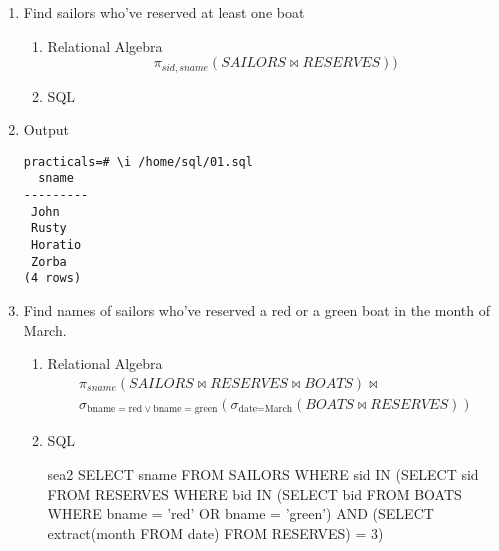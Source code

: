 \begin{enumerate}
	\item  Find sailors who've reserved at least one boat
	      \begin{enumerate}
		      \item Relational Algebra
		            \begin{equation*}
			            \pi_{sid, sname}(SAILORS \bowtie RESERVES))
		            \end{equation*}

		      \item  SQL \linebreak {}
	      \end{enumerate}

	      \pagebreak

	\item Output
	      \begin{lstlisting}[style=output]
practicals=# \i /home/sql/01.sql 
  sname  
---------
 John
 Rusty
 Horatio
 Zorba
(4 rows)
            \end{lstlisting}
	      \vspace{1cm}

	\item Find names of sailors who've reserved a red or a green boat in the month of March.
	      \begin{enumerate}
		      \item Relational Algebra
		            \begin{multline*}
			            \pi_{sname}(SAILORS \bowtie RESERVES \bowtie BOATS) \bowtie \\
			            \sigma_{\text{bname} = \text{red} \lor \text{bname} = \text{green}}(\sigma_{\text{date} = \text{March}}(BOATS \bowtie RESERVES))
		            \end{multline*}

		      \item  SQL

		            \begin{sqlQuery}{sea2}
                            SELECT sname
                            FROM SAILORS
                            WHERE sid IN
                                (SELECT sid
                                FROM RESERVES
                                WHERE bid IN
                                    (SELECT bid
                                    FROM BOATS
                                    WHERE bname = 'red' OR bname = 'green')
                                AND (SELECT extract(month FROM date) FROM RESERVES) = 3)
                    \end{sqlQuery}


\end{enumerate}
\end{enumerate}
